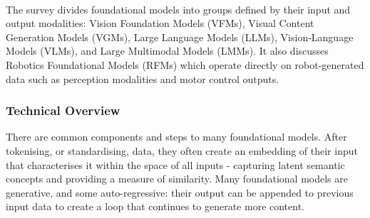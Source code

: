 \\
The survey \cite{hu2023generalpurpose} divides foundational models into groups defined by their input and output modalities: Vision Foundation Models (VFMs), Visual Content Generation Models (VGMs), Large Language Models (LLMs), Vision-Language Models (VLMs), and Large Multimodal Models (LMMs). It also discusses Robotics Foundational Models (RFMs) which operate directly on robot-generated data such as perception modalities and motor control outputs.

\subsubsection{Technical Overview}
There are common components and steps to many foundational models. After tokenising, or standardising, data, they often create an embedding of their input that characterises it within the space of all inputs - capturing latent semantic concepts and providing a measure of similarity. Many foundational models are generative, and some auto-regressive: their output can be appended to previous input data to create a loop that continues to generate more content.

